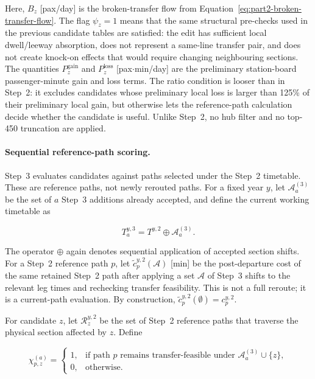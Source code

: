 \documentclass[preprint,12pt]{elsarticle}
\begin{document}
Here, \(B_z\) [pax/day] is the broken-transfer flow from Equation~\eqref{eq:part2-broken-transfer-flow}. The flag \(\psi_z=1\) means that the same structural pre-checks used in the previous candidate tables are satisfied: the edit has sufficient local dwell/leeway absorption, does not represent a same-line transfer pair, and does not create knock-on effects that would require changing neighbouring sections. The quantities \(P^{\mathrm{gain}}_z\) and \(P^{\mathrm{loss}}_z\) [pax\(\cdot\)min/day] are the preliminary station-board passenger-minute gain and loss terms. The ratio condition is looser than in Step~2: it excludes candidates whose preliminary local loss is larger than 125\% of their preliminary local gain, but otherwise lets the reference-path calculation decide whether the candidate is useful. Unlike Step~2, no hub filter and no top-450 truncation are applied.
\newpage
\paragraph*{Sequential reference-path scoring.}
Step~3 evaluates candidates against paths selected under the Step~2 timetable. These are reference paths, not newly rerouted paths. For a fixed year \(y\), let \(\mathcal{A}^{(3)}_a\) be the set of \(a\) Step~3 additions already accepted, and define the current working timetable as

\begin{equation}
T^{y,3}_a
=
T^{y,2}\oplus\mathcal{A}^{(3)}_a .
\label{eq:part2-step3-working-timetable}
\end{equation}

The operator \(\oplus\) again denotes sequential application of accepted section shifts. For a Step~2 reference path \(p\), let \(\widetilde c_p^{y,2}(\mathcal{A})\) [min] be the post-departure cost of the same retained Step~2 path after applying a set \(\mathcal{A}\) of Step~3 shifts to the relevant leg times and rechecking transfer feasibility. This is not a full reroute; it is a current-path evaluation. By construction, \(\widetilde c_p^{y,2}(\emptyset)=c_p^{y,2}\).

For candidate \(z\), let \(\mathcal{R}^{y,2}_z\) be the set of Step~2 reference paths that traverse the physical section affected by \(z\). Define

\[
\chi_{p,z}^{(a)}
=
\begin{cases}
1, & \text{if path \(p\) remains transfer-feasible under }
\mathcal{A}^{(3)}_a\cup\{z\},\\
0, & \text{otherwise.}
\end{cases}
\]
\end{document}
